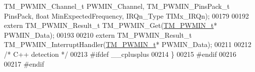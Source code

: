 \begin{DoxyCode}
      TM\_PWMIN\_Channel\_t PWMIN\_Channel, TM\_PWMIN\_PinsPack\_t PinsPack, \textcolor{keywordtype}{float} MinExpectedFrequency, IRQn\_Type TIMx\_IRQn);
00179 
00192 \textcolor{keyword}{extern} TM\_PWMIN\_Result\_t TM\_PWMIN\_Get(\hyperlink{struct_t_m___p_w_m_i_n__t}{TM\_PWMIN\_t}* PWMIN\_Data);
00193 
00210 \textcolor{keyword}{extern} TM\_PWMIN\_Result\_t TM\_PWMIN\_InterruptHandler(\hyperlink{struct_t_m___p_w_m_i_n__t}{TM\_PWMIN\_t}* PWMIN\_Data);
00211 
00212 \textcolor{comment}{/* C++ detection */}
00213 \textcolor{preprocessor}{#ifdef \_\_cplusplus}
00214 \}
00215 \textcolor{preprocessor}{#endif}
00216 
00217 \textcolor{preprocessor}{#endif}
\end{DoxyCode}
